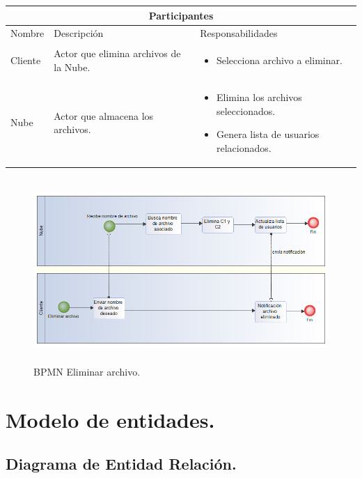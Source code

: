 \begin{tabular}{ |p{2cm}|p{6cm}|p{6cm}|  }
\hline
\multicolumn{3}{|c|}{  Participantes  } \\
\hline

{ Nombre }  & { Descripción } & { Responsabilidades} \\
\hline
{ Cliente } &   Actor que elimina archivos de la Nube.  &  
			\begin{itemize}	
				\item Selecciona archivo a eliminar.
			\end{itemize}   \\ 
\hline
{ Nube } &   Actor que almacena los archivos.  &  
			\begin{itemize}	
				\item Elimina los archivos seleccionados.
				\item Genera lista de usuarios relacionados.
			\end{itemize}   \\ 
\hline
\end{tabular}

\begin{figure}[H]
\centering
	\includegraphics[width=16cm, height=7cm]{./images/BPM_Eliminar.png}
	\caption{BPMN Eliminar archivo.}

\end{figure} 

\newpage
\section{Modelo de entidades. }

\subsection{Diagrama de Entidad Relación. }

